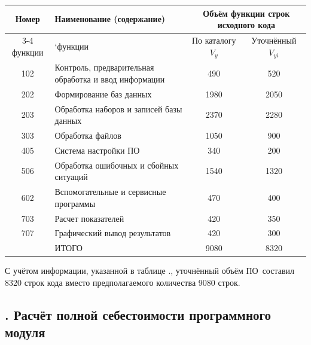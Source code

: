 {{\begin{Center}
			\begin{tabular}{|c|p{6.5cm}|c|c|}
				\hline
				Номер   & Наименование (содержание)\centering                 & \multicolumn{2}{c|}{Объём функции строк исходного кода} \\ \cline{3-4}
				функции & `функции\centering& По каталогу $V_y$     & Уточнённый $V_{yi}$             \\ \hline
				102     & Контроль, предварительная обработка и ввод информации\centering & 490& 520\\ \hline
				202     & Формирование баз данных\centering                   & 1980& 2050\\ \hline
				203& Обработка наборов и записей базы данных\centering                   & 2370& 2280\\ \hline
				303     & Обработка файлов\centering                          & 1050& 900\\ \hline
				405     & Система настройки ПО\centering                      & 340& 200\\ \hline
				506     & Обработка ошибочных и сбойных ситуаций\centering    & 1540& 1320\\ \hline
				602     & Вспомогательные и сервисные программы\centering     & 470& 400\\ \hline
				703     & Расчет показателей\centering                        & 420& 350\\ \hline
				707     & Графический вывод результатов\centering             & 420& 300\\ \hline
				& ИТОГО\centering                                     & 9080& 8320\\ \hline
			\end{tabular}
			
			\botTablespace \end{Center}}
	\botTablespace
	
	\redline С учётом информации, указанной в таблице \thechaptercntr .\thetablecntr, уточнённый объём ПО составил 8320 строк кода вместо предполагаемого количества 9080 строк. \addtocounter{tablecntr}{1}
	
	\par
}

\subtitlespace

\subsection*{ 
	\gostTitleFont
	\redline
	\thechaptercntr .\thesubchaptercntr \spc
	Расчёт полной себестоимости программного модуля
} \addtocounter{subchaptercntr}{1}

